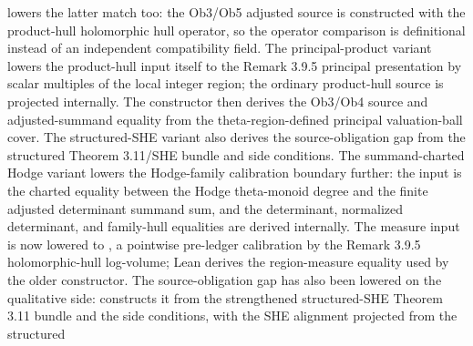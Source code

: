\begin{proposition}
  lowers the latter match too: the Ob3/Ob5 adjusted source is constructed with
  the product-hull holomorphic hull operator, so the operator comparison is
  definitional instead of an independent compatibility field.  The
  principal-product variant
  lowers the product-hull input itself to the Remark 3.9.5 principal
  presentation by scalar multiples of the local integer region; the ordinary
  product-hull source is projected internally.  The constructor
  then derives the Ob3/Ob4 source and adjusted-summand equality from the
  theta-region-defined principal valuation-ball cover.  The structured-SHE
  variant
  also derives the source-obligation gap from the structured Theorem 3.11/SHE
  bundle and side conditions.  The summand-charted Hodge variant
  lowers the Hodge-family calibration boundary further: the input is the
  charted equality between the Hodge theta-monoid degree and the finite
  adjusted determinant summand sum, and the determinant, normalized
  determinant, and family-hull equalities are derived internally.  The
  measure input is now lowered to
  ,
  a pointwise pre-ledger calibration by the Remark 3.9.5 holomorphic-hull
  log-volume; Lean derives the region-measure equality used by the older
  constructor.  The
  source-obligation gap has also been lowered
  on the qualitative side:
  constructs it from the strengthened structured-SHE Theorem 3.11 bundle and
  the side conditions, with the SHE alignment projected from the structured

\end{proposition}
